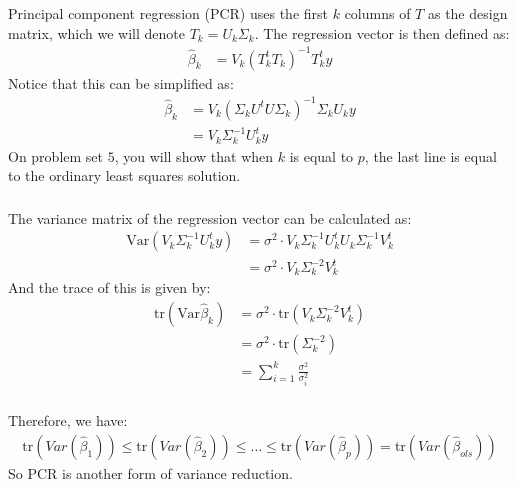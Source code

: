 \begin{frame}[fragile] \frametitle{}

Principal component regression (PCR) uses the first $k$ columns of $T$
as the design matrix, which we will denote $T_k = U_k \Sigma_k$.
\pause The regression vector is then defined as:
\begin{align*}
\widehat{\beta}_{k} &= V_k (T_k^t T_k)^{-1} T_k^t y
\end{align*}
\pause Notice that this can be simplified as:
\begin{align*}
\widehat{\beta}_{k} &= V_k (\Sigma_k U^t U \Sigma_k)^{-1} \Sigma_k U_k y \\
&= V_k \Sigma_k^{-1} U^t_k y
\end{align*}
On problem set $5$, you will show that when $k$ is equal to $p$, the last
line is equal to the ordinary least squares solution.

\end{frame}

\begin{frame}[fragile] \frametitle{}

The variance matrix of the regression vector can be calculated as:
\begin{align*}
\text{Var} (V_k \Sigma_k^{-1} U^t_k y)
  &= \sigma^2 \cdot V_k \Sigma_k^{-1} U^t_k U_k \Sigma_k^{-1}  V_k^t \\
  &= \sigma^2 \cdot V_k \Sigma_k^{-2} V_k^t
\end{align*}
\pause And the trace of this is given by:
\begin{align*}
\text{tr} \left( \text{Var} \widehat{\beta}_{k} \right)
  &= \sigma^2 \cdot \text{tr} \left( V_k \Sigma_k^{-2} V_k^t \right) \\
  &= \sigma^2 \cdot \text{tr} \left( \Sigma_k^{-2} \right) \\
  &= \sum_{i=1}^{k} \frac{\sigma^2}{\sigma_i^2}
\end{align*}

\end{frame}

\begin{frame}[fragile] \frametitle{}

Therefore, we have:
\begin{align*}
\text{tr} \left( Var(\widehat{\beta}_1) \right)  \leq
 \text{tr} \left( Var(\widehat{\beta}_2) \right) \leq
 \ldots \leq \text{tr} \left( Var(\widehat{\beta}_p) \right) =
 \text{tr} \left( Var(\widehat{\beta}_{ols}) \right)
\end{align*}
So PCR is another form of variance reduction.

\end{frame}

